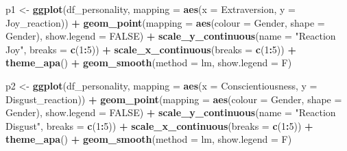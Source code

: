 \documentclass[
]{book}
\newenvironment{Shaded}{\begin{snugshade}}{\end{snugshade}}
\newcommand{\AttributeTok}[1]{\textcolor[rgb]{0.13,0.29,0.53}{#1}}
\newcommand{\ConstantTok}[1]{\textcolor[rgb]{0.56,0.35,0.01}{#1}}
\newcommand{\DecValTok}[1]{\textcolor[rgb]{0.00,0.00,0.81}{#1}}
\newcommand{\FunctionTok}[1]{\textcolor[rgb]{0.13,0.29,0.53}{\textbf{#1}}}
\newcommand{\NormalTok}[1]{#1}
\newcommand{\OtherTok}[1]{\textcolor[rgb]{0.56,0.35,0.01}{#1}}
\newcommand{\SpecialCharTok}[1]{\textcolor[rgb]{0.81,0.36,0.00}{\textbf{#1}}}
\newcommand{\StringTok}[1]{\textcolor[rgb]{0.31,0.60,0.02}{#1}}
\begin{document}
\begin{Shaded}
\begin{Highlighting}[]
\NormalTok{p1 }\OtherTok{\textless{}{-}} \FunctionTok{ggplot}\NormalTok{(df\_personality, }\AttributeTok{mapping =} \FunctionTok{aes}\NormalTok{(}\AttributeTok{x =}\NormalTok{ Extraversion, }\AttributeTok{y =}\NormalTok{ Joy\_reaction)) }\SpecialCharTok{+}
  \FunctionTok{geom\_point}\NormalTok{(}\AttributeTok{mapping =} \FunctionTok{aes}\NormalTok{(}\AttributeTok{colour =}\NormalTok{ Gender, }\AttributeTok{shape =}\NormalTok{ Gender), }\AttributeTok{show.legend =} \ConstantTok{FALSE}\NormalTok{) }\SpecialCharTok{+}
  \FunctionTok{scale\_y\_continuous}\NormalTok{(}\AttributeTok{name =} \StringTok{"Reaction Joy"}\NormalTok{, }\AttributeTok{breaks =} \FunctionTok{c}\NormalTok{(}\DecValTok{1}\SpecialCharTok{:}\DecValTok{5}\NormalTok{)) }\SpecialCharTok{+}
  \FunctionTok{scale\_x\_continuous}\NormalTok{(}\AttributeTok{breaks =} \FunctionTok{c}\NormalTok{(}\DecValTok{1}\SpecialCharTok{:}\DecValTok{5}\NormalTok{)) }\SpecialCharTok{+}
  \FunctionTok{theme\_apa}\NormalTok{() }\SpecialCharTok{+}
  \FunctionTok{geom\_smooth}\NormalTok{(}\AttributeTok{method =}\NormalTok{ lm, }\AttributeTok{show.legend =}\NormalTok{ F)}


\NormalTok{p2 }\OtherTok{\textless{}{-}} \FunctionTok{ggplot}\NormalTok{(df\_personality, }\AttributeTok{mapping =} \FunctionTok{aes}\NormalTok{(}\AttributeTok{x =}\NormalTok{ Conscientiousness, }\AttributeTok{y =}\NormalTok{ Disgust\_reaction)) }\SpecialCharTok{+}
  \FunctionTok{geom\_point}\NormalTok{(}\AttributeTok{mapping =} \FunctionTok{aes}\NormalTok{(}\AttributeTok{colour =}\NormalTok{ Gender, }\AttributeTok{shape =}\NormalTok{ Gender),  }\AttributeTok{show.legend =} \ConstantTok{FALSE}\NormalTok{) }\SpecialCharTok{+}
  \FunctionTok{scale\_y\_continuous}\NormalTok{(}\AttributeTok{name =} \StringTok{"Reaction Disgust"}\NormalTok{, }\AttributeTok{breaks =} \FunctionTok{c}\NormalTok{(}\DecValTok{1}\SpecialCharTok{:}\DecValTok{5}\NormalTok{)) }\SpecialCharTok{+}
  \FunctionTok{scale\_x\_continuous}\NormalTok{(}\AttributeTok{breaks =} \FunctionTok{c}\NormalTok{(}\DecValTok{1}\SpecialCharTok{:}\DecValTok{5}\NormalTok{)) }\SpecialCharTok{+}
  \FunctionTok{theme\_apa}\NormalTok{() }\SpecialCharTok{+}
  \FunctionTok{geom\_smooth}\NormalTok{(}\AttributeTok{method =}\NormalTok{ lm, }\AttributeTok{show.legend =}\NormalTok{ F)}


\end{Highlighting}
\end{Shaded}
\end{document}
